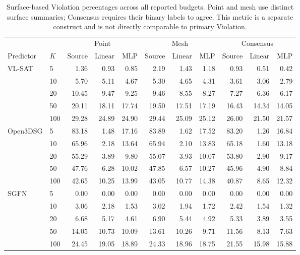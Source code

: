 \begin{table}[t]
\centering
{\small
\setlength{\tabcolsep}{1.4pt}
\begin{tabular}{llrrrrrrrrr}
\toprule
& & \multicolumn{3}{c}{Point} & \multicolumn{3}{c}{Mesh} & \multicolumn{3}{c}{Consensus} \\
\cmidrule(lr){3-5}\cmidrule(lr){6-8}\cmidrule(lr){9-11}
Predictor & $K$ & Source & Linear & MLP & Source & Linear & MLP & Source & Linear & MLP \\
\midrule
\multirow{5}{*}{VL-SAT}
 & 5   & 1.36 & 0.93 & 0.85 & 2.19 & 1.43 & 1.18 & 0.93 & 0.51 & 0.42 \\
 & 10  & 5.70 & 5.11 & 4.67 & 5.30 & 4.65 & 4.31 & 3.61 & 3.06 & 2.79 \\
 & 20  & 10.45 & 9.47 & 9.25 & 9.46 & 8.55 & 8.27 & 7.27 & 6.36 & 6.17 \\
 & 50  & 20.11 & 18.11 & 17.74 & 19.50 & 17.51 & 17.19 & 16.43 & 14.34 & 14.05 \\
 & 100 & 29.28 & 24.89 & 24.90 & 29.44 & 25.09 & 25.12 & 26.00 & 21.50 & 21.57 \\
\midrule
\multirow{5}{*}{Open3DSG}
 & 5   & 83.18 & 1.48 & 17.16 & 83.89 & 1.62 & 17.52 & 83.20 & 1.26 & 16.84 \\
 & 10  & 65.96 & 2.18 & 13.64 & 65.94 & 2.10 & 13.83 & 65.18 & 1.60 & 13.18 \\
 & 20  & 55.29 & 3.89 & 9.80 & 55.07 & 3.93 & 10.07 & 53.80 & 2.90 & 9.17 \\
 & 50  & 47.76 & 6.28 & 10.02 & 47.85 & 6.57 & 10.27 & 45.96 & 4.90 & 8.84 \\
 & 100 & 42.65 & 10.25 & 13.99 & 43.05 & 10.77 & 14.38 & 40.87 & 8.65 & 12.32 \\
\midrule
\multirow{5}{*}{SGFN}
 & 5   & 0.00 & 0.00 & 0.00 & 0.00 & 0.00 & 0.00 & 0.00 & 0.00 & 0.00 \\
 & 10  & 3.06 & 2.18 & 1.53 & 3.02 & 1.94 & 1.72 & 2.42 & 1.54 & 1.32 \\
 & 20  & 6.68 & 5.17 & 4.61 & 6.90 & 5.44 & 4.92 & 5.33 & 3.89 & 3.55 \\
 & 50  & 14.05 & 10.73 & 10.09 & 13.61 & 10.26 & 9.71 & 11.56 & 8.13 & 7.63 \\
 & 100 & 24.45 & 19.05 & 18.89 & 24.33 & 18.96 & 18.75 & 21.55 & 15.98 & 15.88 \\
\bottomrule
\end{tabular}
}
\caption{Surface-based Violation percentages across all reported budgets.
Point and mesh use distinct surface summaries; Consensus requires their binary
labels to agree. This metric is a separate construct and is not directly
comparable to primary Violation.}
\label{tab:surface-audit-full}
\end{table}

